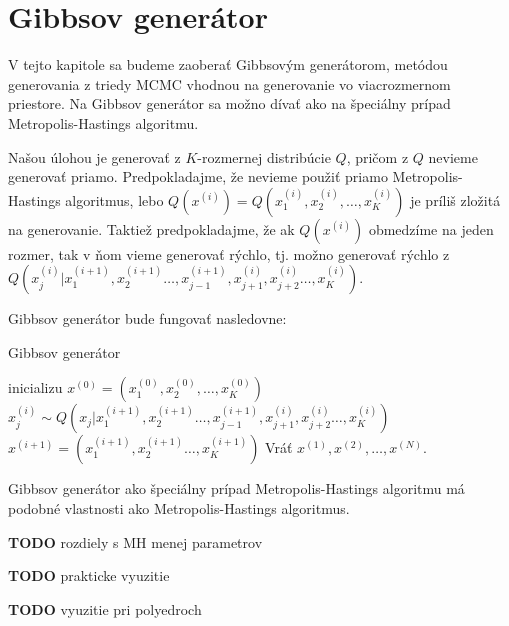 \chapter{Gibbsov generátor}

V tejto kapitole sa budeme zaoberať Gibbsovým generátorom, metódou generovania z triedy MCMC vhodnou na generovanie vo viacrozmernom priestore. Na Gibbsov generátor sa možno dívať ako na špeciálny prípad Metropolis-Hastings algoritmu.

Našou úlohou je generovať z $K$-rozmernej distribúcie $Q$, pričom z $Q$ nevieme generovať priamo. Predpokladajme, že nevieme použiť priamo Metropolis-Hastings algoritmus, lebo $Q(x^{(i)})=Q(x^{(i)}_1, x^{(i)}_2, \dots, x^{(i)}_K)$ je príliš zložitá na generovanie. Taktiež predpokladajme, že ak $Q(x^{(i)})$ obmedzíme na jeden rozmer, tak v ňom vieme generovať rýchlo, tj. možno generovať rýchlo z $Q(x^{(i)}_j | x^{(i+1)}_1, x^{(i+1)}_2 \dots, x^{(i+1)}_{j-1}, x^{(i)}_{j+1}, x^{(i)}_{j+2} \dots, x^{(i)}_K)$.

Gibbsov generátor bude fungovať nasledovne:

\begin{algorithm}[H]
	\caption{Gibbsov generátor \cite{mackay_introduction_1998}}
	\label{gibbs}
	\begin{algorithmic}[1]
		\State inicializu $x^{(0)} = (x^{(0)}_1, x^{(0)}_2, \dots, x^{(0)}_K)$
				\State $x^{(i)}_j \sim Q(x_j | x^{(i+1)}_1, x^{(i+1)}_2 \dots, x^{(i+1)}_{j-1}, x^{(i)}_{j+1}, x^{(i)}_{j+2} \dots, x^{(i)}_K)$
			\EndFor
			\State $x^{(i+1)}= (x^{(i+1)}_1, x^{(i+1)}_2 \dots, x^{(i+1)}_K)$
		\EndFor
		\State Vráť ${x^{(1)},x^{(2)},\dots,x^{(N)}}$.
	\end{algorithmic}
\end{algorithm}

Gibbsov generátor ako špeciálny prípad Metropolis-Hastings algoritmu má podobné vlastnosti ako Metropolis-Hastings algoritmus.

\textbf{TODO} rozdiely s MH  menej parametrov

\textbf{TODO} prakticke vyuzitie

\textbf{TODO} vyuzitie pri polyedroch


